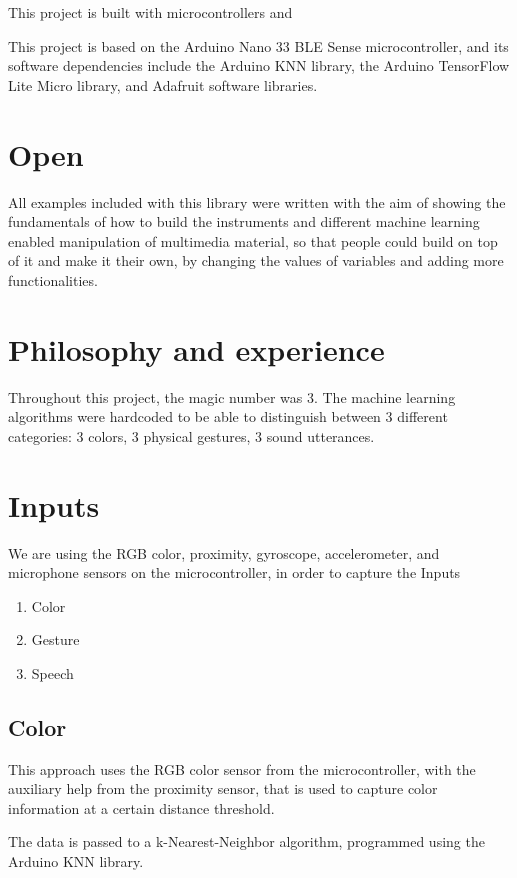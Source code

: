 This project is built with microcontrollers and 

This project is based on the Arduino Nano 33 BLE Sense microcontroller, and its software dependencies include the Arduino KNN library, the Arduino TensorFlow Lite Micro library, and Adafruit software libraries. 

\section{Open}

All examples included with this library were written with the aim of showing the fundamentals of how to build the instruments and different machine learning enabled manipulation of multimedia material, so that people could build on top of it and make it their own, by changing the values of variables and adding more functionalities.

\section{Philosophy and experience}

Throughout this project, the magic number was 3. The machine learning algorithms were hardcoded to be able to distinguish between 3 different categories: 3 colors, 3 physical gestures, 3 sound utterances.

\section{Inputs}

We are using the RGB color, proximity, gyroscope, accelerometer, and microphone sensors on the microcontroller, in order to capture the Inputs

\begin{enumerate}
  \item Color
  \item Gesture
  \item Speech
\end{enumerate}

\subsection{Color}

This approach uses the RGB color sensor from the microcontroller, with the auxiliary help from the proximity sensor, that is used to capture color information at a certain distance threshold.

The data is passed to a k-Nearest-Neighbor algorithm, programmed using the Arduino KNN library.

